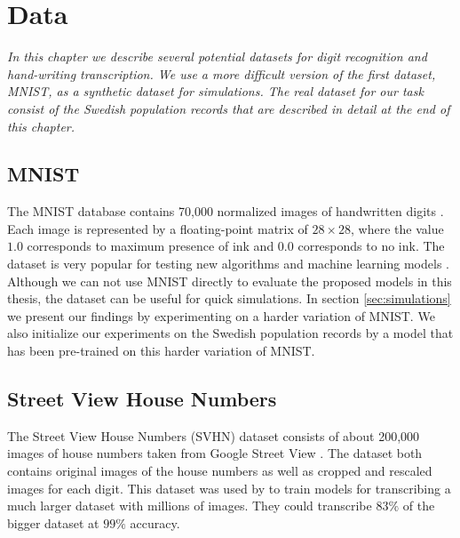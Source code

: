 \chapter{Data}

\textit{In this chapter we describe several potential datasets for digit recognition and hand-writing transcription. We use a more difficult version of the first dataset, MNIST, as a synthetic dataset for simulations. The real dataset for our task consist of the Swedish population records that are described in detail at the end of this chapter.}


\section{MNIST}

The MNIST database contains 70,000 normalized images of handwritten digits \cite{MNIST_orig}.
Each image is represented by a floating-point matrix of $28 \times 28$, where the value $1.0$ corresponds to maximum presence of ink and $0.0$ corresponds to no ink.
The dataset is very popular for testing new algorithms and machine learning models \cite{MNIST}.
Although we can not use MNIST directly to evaluate the proposed models in this thesis, the dataset can be useful for quick simulations.
In section \ref{sec:simulations} we present our findings by experimenting on a harder variation of MNIST.
We also initialize our experiments on the Swedish population records by a model that has been pre-trained on this harder variation of MNIST.

\section{Street View House Numbers}

The Street View House Numbers (SVHN) dataset consists of about 200,000 images of house numbers taken from Google Street View \cite{SVHN}. The dataset both contains original images of the house numbers as well as cropped and rescaled images for each digit. This dataset was used by \textcite{multidigit_streetview} to train models for transcribing a much larger dataset with millions of images. They could transcribe $83\%$ of the bigger dataset at $99\%$ accuracy.

